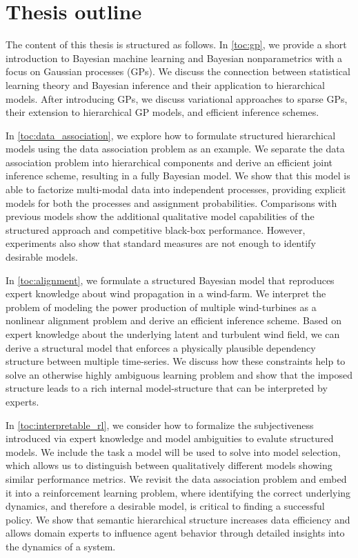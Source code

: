 \section{Thesis outline}
The content of this thesis is structured as follows.
In \cref{toc:gp}, we provide a short introduction to Bayesian machine learning and Bayesian nonparametrics with a focus on Gaussian processes (GPs).
We discuss the connection between statistical learning theory and Bayesian inference and their application to hierarchical models.
After introducing GPs, we discuss variational approaches to sparse GPs, their extension to hierarchical GP models, and efficient inference schemes.

In \cref{toc:data_association}, we explore how to formulate structured hierarchical models using the data association problem as an example.
We separate the data association problem into hierarchical components and derive an efficient joint inference scheme, resulting in a fully Bayesian model.
We show that this model is able to factorize multi-modal data into independent processes, providing explicit models for both the processes and assignment probabilities.
Comparisons with previous models show the additional qualitative model capabilities of the structured approach and competitive black-box performance.
However, experiments also show that standard measures are not enough to identify desirable models.

In \cref{toc:alignment}, we formulate a structured Bayesian model that reproduces expert knowledge about wind propagation in a wind-farm.
We interpret the problem of modeling the power production of multiple wind-turbines as a nonlinear alignment problem and derive an efficient inference scheme.
Based on expert knowledge about the underlying latent and turbulent wind field, we can derive a structural model that enforces a physically plausible dependency structure between multiple time-series.
We discuss how these constraints help to solve an otherwise highly ambiguous learning problem and show that the imposed structure leads to a rich internal model-structure that can be interpreted by experts.

In \cref{toc:interpretable_rl}, we consider how to formalize the subjectiveness introduced via expert knowledge and model ambiguities to evalute structured models.
We include the task a model will be used to solve into model selection, which allows us to distinguish between qualitatively different models showing similar performance metrics.
We revisit the data association problem and embed it into a reinforcement learning problem, where identifying the correct underlying dynamics, and therefore a desirable model, is critical to finding a successful policy.
We show that semantic hierarchical structure increases data efficiency and allows domain experts to influence agent behavior through detailed insights into the dynamics of a system.

